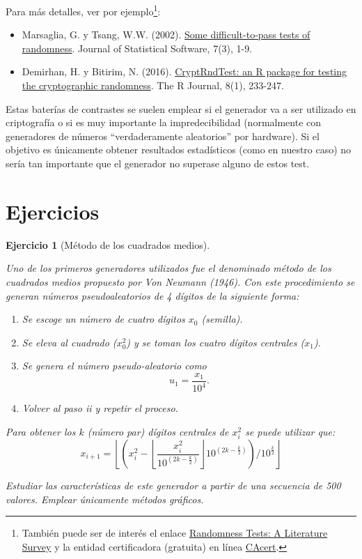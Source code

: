 \documentclass[
]{book}
\theoremstyle{break}
\newtheorem{exercise}{Ejercicio}[chapter]
\theoremstyle{nonumberplain}
\begin{document}
Para más detalles, ver por ejemplo\footnote{También puede ser de interés el enlace \href{http://www.ciphersbyritter.com/RES/RANDTEST.HTM}{Randomness Tests: A Literature Survey} y la entidad certificadora (gratuita) en línea \href{http://www.cacert.at/random}{CAcert}.}:

\begin{itemize}
\item
  Marsaglia, G. y Tsang, W.W. (2002). \href{http://www.jstatsoft.org/v07/i03}{Some difficult-to-pass tests of randomness}. Journal of Statistical Software, 7(3), 1-9.
\item
  Demirhan, H. y Bitirim, N. (2016). \href{https://journal.r-project.org/archive/2016/RJ-2016-016/index.html}{CryptRndTest: an R package for testing the cryptographic randomness}. The R Journal, 8(1), 233-247.
\end{itemize}

Estas baterías de contrastes se suelen emplear si el generador va a ser utilizado en criptografía o si es muy importante la impredecibilidad (normalmente con generadores de números ``verdaderamente aleatorios'' por hardware).
Si el objetivo es únicamente obtener resultados estadísticos (como en nuestro caso) no sería tan importante que el generador no superase alguno de estos test.

\hypertarget{ejercicios-1}{%
\section{Ejercicios}\label{ejercicios-1}}

\begin{exercise}[Método de los cuadrados medios]
\protect\hypertarget{exr:RANDVN}{}\label{exr:RANDVN}

Uno de los primeros generadores utilizados fue el denominado método de los cuadrados medios propuesto por Von Neumann (1946).
Con este procedimiento se generan números pseudoaleatorios de 4 dígitos de la siguiente forma:

\begin{enumerate}
\def\labelenumi{\roman{enumi}.}
\item
  Se escoge un número de cuatro dígitos \(x_0\) (semilla).
\item
  Se eleva al cuadrado (\(x_0^2\)) y se toman los cuatro dígitos centrales (\(x_1\)).
\item
  Se genera el número pseudo-aleatorio como \[u_1=\frac{x_1}{10^{4}}.\]
\item
  Volver al paso ii y repetir el proceso.
\end{enumerate}

Para obtener los \(k\) (número par) dígitos centrales de \(x_{i}^2\)
se puede utilizar que:
\[x_{i+1}=\left\lfloor \left(  x_{i}^2-\left\lfloor \dfrac{x_{i}^2}{10^{(2k-\frac{k}2)}}\right\rfloor 10^{(2k-\frac{k}2)}\right)
/10^{\frac{k}2}\right\rfloor\]

Estudiar las características de este generador a partir de una secuencia de 500 valores.
Emplear únicamente métodos gráficos.
\end{exercise}
\end{document}

